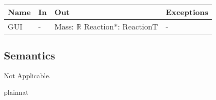 \documentclass[12pt, titlepage]{article}
\begin{document}
\begin{center}
\begin{tabular}{p{2cm} p{4cm} p{4cm} p{2cm}}
\hline
\textbf{Name} & \textbf{In} & \textbf{Out} & \textbf{Exceptions} \\
\hline
{GUI} & - & Mass: $\mathbb{R}$ \newline Reaction*: ReactionT & - \\
\hline
\end{tabular}
\end{center}

\subsection{Semantics}

Not Applicable.


\newpage 
 {plainnat}

\end{document}
